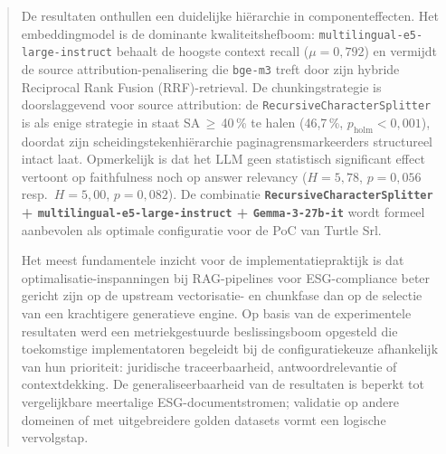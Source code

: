 \documentclass[a0,portrait]{hogent-poster}
\begin{document}
\begin{abstract}
De resultaten onthullen een duidelijke hiërarchie in componenteffecten. Het embeddingmodel is de dominante kwaliteitshefboom: \texttt{multilingual-e5-large-instruct} behaalt de hoogste context recall ($\mu = 0{,}792$) en vermijdt de source attribution-penalisering die \texttt{bge-m3} treft door zijn hybride Reciprocal Rank Fusion (RRF)-retrieval. De chunkingstrategie is doorslaggevend voor source attribution: de \texttt{RecursiveCharacterSplitter} is als enige strategie in staat SA\,$\geq$\,40\,\% te halen (46{,}7\,\%, $p_{\text{holm}} < 0{,}001$), doordat zijn scheidingstekenhiërarchie paginagrensmarkeerders structureel intact laat. Opmerkelijk is dat het LLM geen statistisch significant effect vertoont op faithfulness noch op answer relevancy ($H = 5{,}78$, $p = 0{,}056$ resp.\ $H = 5{,}00$, $p = 0{,}082$). De combinatie \textbf{\texttt{RecursiveCharacterSplitter} + \texttt{multilingual-e5-large-instruct} + \texttt{Gemma-3-27b-it}} wordt formeel aanbevolen als optimale configuratie voor de PoC van Turtle Srl.

Het meest fundamentele inzicht voor de implementatiepraktijk is dat optimalisatie-inspanningen bij RAG-pipelines voor ESG-compliance beter gericht zijn op de upstream vectorisatie- en chunkfase dan op de selectie van een krachtigere generatieve engine. Op basis van de experimentele resultaten werd een metriekgestuurde beslissingsboom opgesteld die toekomstige implementatoren begeleidt bij de configuratiekeuze afhankelijk van hun prioriteit: juridische traceerbaarheid, antwoordrelevantie of contextdekking. De generaliseerbaarheid van de resultaten is beperkt tot vergelijkbare meertalige ESG-documentstromen; validatie op andere domeinen of met uitgebreidere golden datasets vormt een logische vervolgstap.
\end{abstract}
\end{document}

